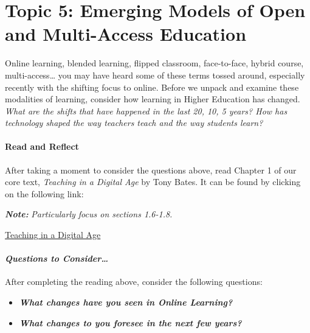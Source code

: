 \documentclass[
]{book}
\providecommand{\tightlist}{%
  \setlength{\itemsep}{0pt}\setlength{\parskip}{0pt}}
\begin{document}
\hypertarget{topic-5-emerging-models-of-open-and-multi-access-education}{%
\section*{Topic 5: Emerging Models of Open and Multi-Access Education}\label{topic-5-emerging-models-of-open-and-multi-access-education}}

Online learning, blended learning, flipped classroom, face-to-face, hybrid course, multi-access\ldots{} you may have heard some of these terms tossed around, especially recently with the shifting focus to online. Before we unpack and examine these modalities of learning, consider how learning in Higher Education has changed. \emph{What are the shifts that have happened in the last 20, 10, 5 years? How has technology shaped the way teachers teach and the way students learn?}

\begin{reflect}
\hypertarget{read-and-reflect}{%
\paragraph*{Read and Reflect}\label{read-and-reflect}}

After taking a moment to consider the questions above, read Chapter 1 of
our core text, \emph{Teaching in a Digital Age} by Tony Bates. It can be
found by clicking on the following link:

\textbf{\emph{Note:}} \emph{Particularly focus on sections 1.6-1.8.}

\href{https://pressbooks.bccampus.ca/teachinginadigitalagev2/part/chapter-1-fundamental-change-in-education/}{Teaching
in a Digital Age}

\hypertarget{questions-to-consider}{%
\paragraph*{\texorpdfstring{\textbf{\emph{Questions to
Consider\ldots{}}}}{Questions to Consider\ldots{}}}\label{questions-to-consider}}

After completing the reading above, consider the following questions:

\begin{itemize}
\tightlist
\item
  \textbf{\emph{What changes have you seen in Online Learning?}}\\
\item
  \textbf{\emph{What changes to you foresee in the next few years?}}
\end{itemize}
\end{reflect}
\end{document}

